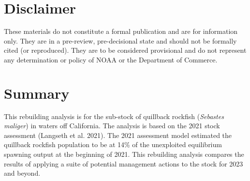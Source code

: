 \documentclass[11pt,
  english,
  a4paper,
]{article}
\begin{document}
\newcommand{\lt}{\ensuremath <}
\newcommand{\gt}{\ensuremath >}


\pagebreak
{}
\setcounter{page}{1}

\renewcommand{\thetable}{\roman{table}}
\renewcommand{\thefigure}{\roman{figure}}

\setlength\parskip{0.5em plus 0.1em minus 0.2em}


\hypertarget{disclaimer}{%
\section*{Disclaimer}\label{disclaimer}}

\leavevmode\tagmcend\tagstructend


These materials do not constitute a formal publication and are for information only. They are in a pre-review, pre-decisional state and should not be formally cited (or reproduced). They are to be considered provisional and do not represent any determination or policy of NOAA or the Department of Commerce.

\leavevmode\tagmcend\tagstructend\par

\pagebreak


\hypertarget{summary}{%
\section*{Summary}\label{summary}}

\leavevmode\tagmcend\tagstructend


This rebuilding analysis is for the sub-stock of quillback rockfish (\emph{Sebastes maliger}) in waters off California. The analysis is based on the 2021 stock assessment {(Langseth et al. 2021)\leavevmode\tagmcend\tagstructend}. The 2021 assessment model estimated the quillback rockfish population to be at 14\% of the unexploited equilibrium spawning output at the beginning of 2021. This rebuilding analysis compares the results of applying a suite of potential management actions to the stock for 2023 and beyond.
\end{document}
